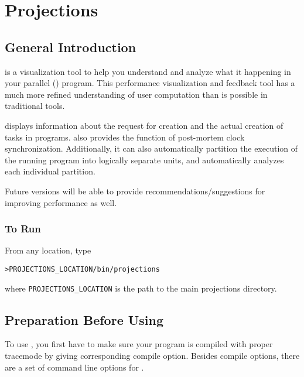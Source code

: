 \section{Projections}

\subsection{General Introduction}
\label{introduction}
\projections{} is a visualization tool to help you understand and analyze what it
happening in your parallel (\charmpp{}) program. This performance visualization and
feedback tool has a much more refined understanding of user computation than is
possible in traditional tools.

\projections{} displays information about the request for creation and the
actual creation of tasks in \charmpp{} programs. \projections{} also provides the
function of post-mortem clock synchronization. Additionally, it can also
automatically partition the execution of the running program into logically
separate units, and automatically analyzes each individual partition.

Future versions will be able to provide recommendations/suggestions for
improving performance as well.

\subsubsection{To Run \projections{}}
From any location, type
\begin{alltt}
	> PROJECTIONS_LOCATION/bin/projections
\end{alltt}
where {\tt PROJECTIONS\_LOCATION} is the path to the main projections
directory.

\subsection{Preparation Before Using \projections{}}
To use \projections{}, you first have to make sure your program is compiled with
proper \projections{} tracemode by giving corresponding compile option. Besides
compile options, there are a set of command line options for \projections{}.

